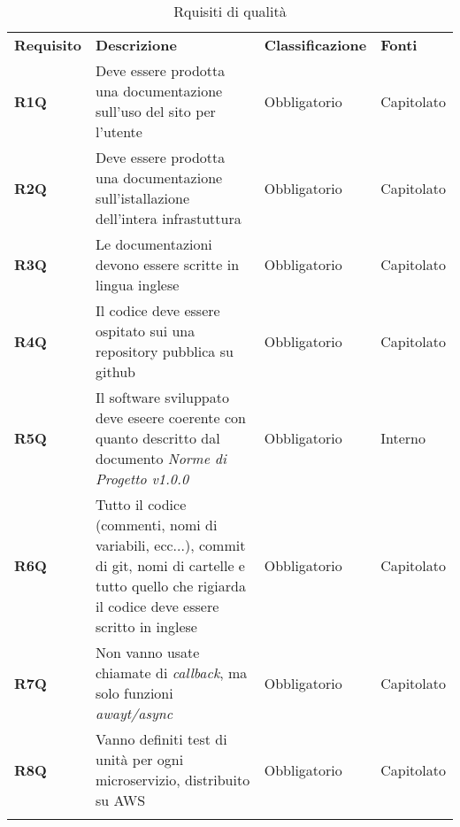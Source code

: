 \begin{center}
    \centering
    \renewcommand{\arraystretch}{1.8}
    \label{tab:RequisitiQualita}
    \begin{longtable}[!h]{p{50px} p{200px} p{100px} p{50px}}
        \rowcolor{logo!70} \textbf{Requisito} & \textbf{Descrizione}                                                                                                                                        & \textbf{Classificazione} & \textbf{Fonti} \\
        \textbf{R1Q}                          & Deve essere prodotta una documentazione sull'uso del sito per l'utente                                                                                      & Obbligatorio             & Capitolato     \\
        \textbf{R2Q}                          & Deve essere prodotta una documentazione sull'istallazione dell'intera infrastuttura                                                                         & Obbligatorio             & Capitolato     \\
        \textbf{R3Q}                          & Le documentazioni devono essere scritte in lingua inglese                                                                                                   & Obbligatorio             & Capitolato     \\
        \textbf{R4Q}                          & Il codice deve essere ospitato sui una repository pubblica su github                                                                                        & Obbligatorio             & Capitolato     \\
        \textbf{R5Q}                          & Il software sviluppato deve eseere coerente con quanto descritto dal documento \textit{Norme di Progetto v1.0.0}                                            & Obbligatorio             & Interno        \\
        \textbf{R6Q}                          & Tutto il codice (commenti, nomi di variabili, ecc...), commit di git, nomi di cartelle e tutto quello che rigiarda il codice deve essere scritto in inglese & Obbligatorio             & Capitolato     \\
        \textbf{R7Q}                          & Non vanno usate chiamate di \textit{callback}, ma solo funzioni \textit{awayt/async}                                                                        & Obbligatorio             & Capitolato     \\
        \textbf{R8Q}                          & Vanno definiti test di unità per ogni microservizio, distribuito su AWS                                                                                     & Obbligatorio             & Capitolato     \\
        \rowcolor{white}\caption{Rquisiti di qualità}
    \end{longtable}
\end{center}


